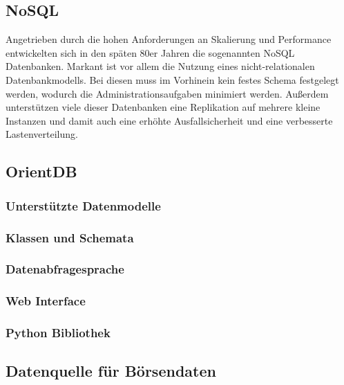 \subsection{NoSQL}


Angetrieben durch die hohen Anforderungen an Skalierung und Performance entwickelten sich in den späten 80er Jahren die sogenannten NoSQL Datenbanken. Markant ist vor allem die Nutzung eines nicht-relationalen Datenbankmodells. Bei diesen muss im Vorhinein kein festes Schema festgelegt werden, wodurch die Administrationsaufgaben minimiert werden. Außerdem unterstützen viele dieser Datenbanken eine Replikation auf mehrere kleine Instanzen und damit auch eine erhöhte Ausfallsicherheit und eine verbesserte Lastenverteilung.

\subsection{OrientDB}

\subsubsection{Unterstützte Datenmodelle}

\subsubsection{Klassen und Schemata}

\subsubsection{Datenabfragesprache}

\subsubsection{Web Interface}

\subsubsection{Python Bibliothek}

\subsection{Datenquelle für Börsendaten}

\clearpage